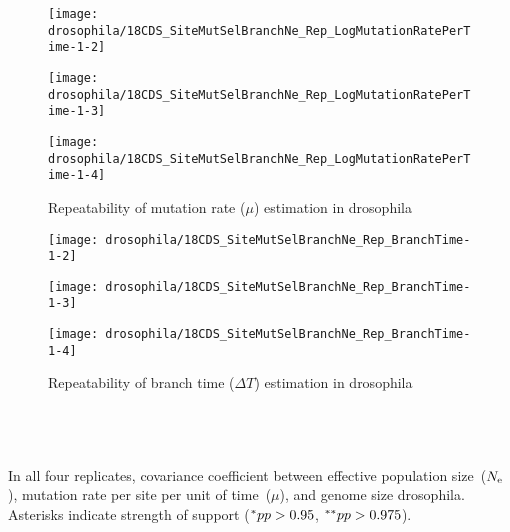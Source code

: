 \begin{figure}[H]
    \centering
    \begin{minipage}{0.32\linewidth}
        \texttt{[image: drosophila/18CDS\_SiteMutSelBranchNe\_Rep\_LogMutationRatePerTime-1-2]}
    \end{minipage} \hfill
    \begin{minipage}{0.32\linewidth}
        \texttt{[image: drosophila/18CDS\_SiteMutSelBranchNe\_Rep\_LogMutationRatePerTime-1-3]}
    \end{minipage} \hfill
    \begin{minipage}{0.32\linewidth}
        \texttt{[image: drosophila/18CDS\_SiteMutSelBranchNe\_Rep\_LogMutationRatePerTime-1-4]}
    \end{minipage}
    \caption[Repeatability of mutation rate estimation in drosophila]{Repeatability of mutation rate ($\mu$) estimation in drosophila}
\end{figure}

\begin{figure}[H]
    \centering
    \begin{minipage}{0.32\linewidth}
        \texttt{[image: drosophila/18CDS\_SiteMutSelBranchNe\_Rep\_BranchTime-1-2]}
    \end{minipage} \hfill
    \begin{minipage}{0.32\linewidth}
        \texttt{[image: drosophila/18CDS\_SiteMutSelBranchNe\_Rep\_BranchTime-1-3]}
    \end{minipage} \hfill
    \begin{minipage}{0.32\linewidth}
        \texttt{[image: drosophila/18CDS\_SiteMutSelBranchNe\_Rep\_BranchTime-1-4]}
    \end{minipage}
    \caption[Repeatability of branch time estimation in drosophila]{Repeatability of branch time ($\Delta T$) estimation in drosophila}
\end{figure}

\begin{table}[H]
     \\
     \\
     \\
    
    \caption[Covariance matrix repeatability in drosophila]{
    In all four replicates, covariance coefficient between effective population size~($N_{\text{e}}$), mutation rate per site per unit of time~($\mu$), and genome size drosophila.
    Asterisks indicate strength of support ($\smash{^{*}} pp > 0.95$, $\smash{^{**}} pp > 0.975$).}
\end{table}

